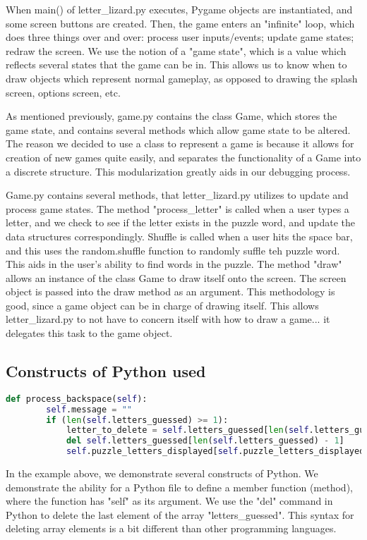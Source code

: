 \documentclass[11pt]{article}
\begin{document}
	When main() of letter\_lizard.py executes, Pygame objects are instantiated, and some screen buttons are created. Then, the game enters an "infinite" loop, which does three things over and over: process user inputs/events; update game states; redraw the screen. We use the notion of a "game state", which is a value which reflects several states that the game can be in. This allows us to know when to draw objects which represent normal gameplay, as opposed to drawing the splash screen, options screen, etc.
	
	As mentioned previously, game.py contains the class Game, which stores the game state, and contains several methods which allow game state to be altered. The reason we decided to use a class to represent a game is because it allows for creation of new games quite easily, and separates the functionality of a Game into a discrete structure. This modularization greatly aids in our debugging process.
	
	Game.py contains several methods, that letter\_lizard.py utilizes to update and process game states. The method "process\_letter" is called when a user types a letter, and we check to see if the letter exists in the puzzle word, and update the data structures correspondingly. Shuffle is called when a user hits the space bar, and this uses the random.shuffle function to randomly suffle teh puzzle word. This aids in the user's ability to find words in the puzzle. The method "draw" allows an instance of the class Game to draw itself onto the screen. The screen object is passed into the draw method as an argument. This methodology is good, since a game object can be in charge of drawing itself. This allows letter\_lizard.py to not have to concern itself with how to draw a game... it delegates this task to the game object.
	
	
\subsection{Constructs of Python used}

\begin{minipage}[t]{1\linewidth}
\begin{lstlisting}[language=Python, %
  title={}, label=bash1]
    def process_backspace(self):
        self.message = ""
        if (len(self.letters_guessed) >= 1):
            letter_to_delete = self.letters_guessed[len(self.letters_guessed) - 1]
            del self.letters_guessed[len(self.letters_guessed) - 1]
            self.puzzle_letters_displayed[self.puzzle_letters_displayed.index('')] = letter_to_delete
\end{lstlisting}
\end{minipage}
In the example above, we demonstrate several constructs of Python. We demonstrate the ability for a Python file to define a member function (method), where the function has "self" as its argument. We use the "del" command in Python to delete the last element of the array "letters\_guessed". This syntax for deleting array elements is a bit different than other programming languages.
\end{document}

